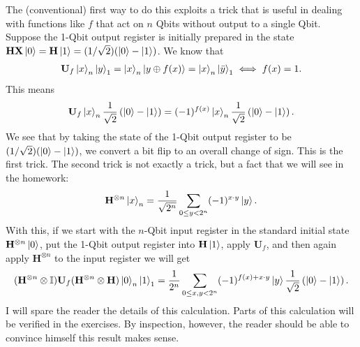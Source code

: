 \documentclass{book}
\theoremstyle{definition}
\newcommand{\X}{\mathbf{X}}
\newcommand{\f}[2]{\frac{#1}{#2}}
\newcommand{\lp}{\left(}
\newcommand{\rp}{\right)}
\newcommand{\U}{\mathbf{U}}
\newcommand{\Id}{\mathbb{I}}
\newcommand{\had}{\mathbf{H}}
\begin{document}
The (conventional) first way to do this exploits a trick that is useful in dealing with functions like $f$ that act on $n$ Qbits without output to a single Qbit. Suppose the 1-Qbit output register is initially prepared in the state $\had \X \ket{0} = \had\ket{1} = (1/\sqrt{2})(\ket{0} - \ket{1})$. We know that 
\begin{align}
\U_f \ket{x}_n\ket{y}_1 = \ket{x}_n\ket{y\oplus f(x)}  = \ket{x}_n\ket{\bar{y}}_1 \iff f(x) = 1.
\end{align} 
This means
\begin{align}
\U_f \ket{x}_n\f{1}{\sqrt{2}}\lp \ket{0} - \ket{1} \rp = (-1)^{f(x)}\ket{x}_n \f{1}{\sqrt{2}}\lp \ket{0} - \ket{1} \rp.
\end{align}
We see that by taking the state of the 1-Qbit output register to be $(1/\sqrt{2})(\ket{0} - \ket{1})$, we convert a bit flip to an overall change of sign. This is the first trick. The second trick is not exactly a trick, but a fact that we will see in the homework:
\begin{align*}
\had^{\otimes n}\ket{x}_n = \f{1}{\sqrt{2^n}} \sum_{0\leq y < 2^n}(-1)^{x\cdot y}\ket{y}.
\end{align*}
With this, if we start with the $n$-Qbit input register in the standard initial state $\had^{\otimes n}\ket{0}$, put the 1-Qbit output register into $\had\ket{1}$, apply $\U_f$, and then again apply $\had^{\otimes n}$ to the input register we will get
\begin{align}
(\had^{\otimes n} \otimes \Id)\U_f(\had^{\otimes n} \otimes \had)\ket{0}_n\ket{1}_1 = \f{1}{2^n}\sum_{0\leq x,y< 2^n}(-1)^{f(x)+x\cdot y}\ket{y}\f{1}{\sqrt{2}}\lp \ket{0} - \ket{1} \rp.
\end{align}
I will spare the reader the details of this calculation. Parts of this calculation will be verified in the exercises. By inspection, however, the reader should be able to convince himself this result makes sense. \\
\end{document}
